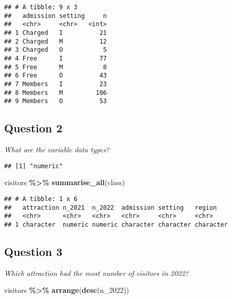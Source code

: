 \documentclass[
]{article}
\newenvironment{Shaded}{\begin{snugshade}}{\end{snugshade}}
\newcommand{\FunctionTok}[1]{\textcolor[rgb]{0.13,0.29,0.53}{\textbf{#1}}}
\newcommand{\NormalTok}[1]{#1}
\newcommand{\SpecialCharTok}[1]{\textcolor[rgb]{0.81,0.36,0.00}{\textbf{#1}}}
\begin{document}
\begin{verbatim}
## # A tibble: 9 x 3
##   admission setting     n
##   <chr>     <chr>   <int>
## 1 Charged   I          21
## 2 Charged   M          12
## 3 Charged   O           5
## 4 Free      I          77
## 5 Free      M           8
## 6 Free      O          43
## 7 Members   I          23
## 8 Members   M         106
## 9 Members   O          53
\end{verbatim}

\subsection{Question 2}\label{question-2}

\emph{What are the variable data types?}

\begin{Shaded}
\end{Shaded}

\begin{verbatim}
## [1] "numeric"
\end{verbatim}

\begin{Shaded}
\begin{Highlighting}[]
\NormalTok{visitors }\SpecialCharTok{\%\textgreater{}\%} \FunctionTok{summarise\_all}\NormalTok{(class)}
\end{Highlighting}
\end{Shaded}

\begin{verbatim}
## # A tibble: 1 x 6
##   attraction n_2021  n_2022  admission setting   region   
##   <chr>      <chr>   <chr>   <chr>     <chr>     <chr>    
## 1 character  numeric numeric character character character
\end{verbatim}

\subsection{Question 3}\label{question-3}

\emph{Which attraction had the most number of visitors in 2022?}

\begin{Shaded}
\begin{Highlighting}[]
\NormalTok{visitors }\SpecialCharTok{\%\textgreater{}\%} \FunctionTok{arrange}\NormalTok{(}\FunctionTok{desc}\NormalTok{(n\_2022))}
\end{Highlighting}
\end{Shaded}
\end{document}
